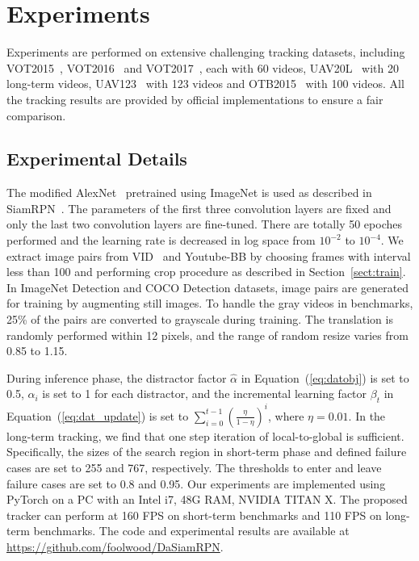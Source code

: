 \documentclass[runningheads]{llncs}
\begin{document}
\section{Experiments}

Experiments are performed on extensive challenging tracking datasets,
including VOT2015~\cite{VOT2015}, VOT2016~\cite{VOT2016} and VOT2017~\cite{VOT2017}, each with 60 videos, UAV20L~\cite{UAV} with 20 long-term videos, UAV123~\cite{UAV} with 123 videos and OTB2015~\cite{OTB2015} with 100 videos. All the tracking results are provided by official implementations to ensure a fair comparison.


\subsection{Experimental Details}

The modified AlexNet~\cite{AlexNet} pretrained using ImageNet \cite{ILSVRC15} is used as described in SiamRPN~\cite{SiamRPN}.
The parameters of the first three convolution layers are fixed and only the last two convolution
layers are fine-tuned. There are totally 50 epoches performed and the learning rate is decreased in log space from $10^{-2}$ to $10^{-4}$.
We extract image pairs from VID~\cite{ILSVRC15} and Youtube-BB \cite{YouTubeBB} by choosing frames with interval less than 100 and performing crop procedure as described in Section~\ref{sect:train}. In ImageNet Detection \cite{ILSVRC15} and COCO Detection \cite{COCO} datasets, image pairs are generated for training by augmenting still images.
To handle the gray videos in benchmarks, 25\% of the pairs are converted to grayscale during training. The translation is randomly performed within 12 pixels, and the range of random resize varies from 0.85 to 1.15. 

During inference phase, the distractor factor $\hat{\alpha}$ in Equation~(\ref{eq:datobj}) is set to 0.5, $\alpha_i$ is set to 1 for each distractor, and the incremental learning factor $\beta_t$ in Equation~(\ref{eq:dat_update}) is set to $\sum_{i=0}^{t-1}(\frac{\eta}{1-\eta})^i$, where $\eta=0.01$. In the long-term tracking, we find that one step iteration of local-to-global is sufficient. Specifically, the sizes of the search region in short-term phase and defined failure cases are set to 255 and 767, respectively. The thresholds to enter and leave failure cases are set to 0.8 and 0.95.
Our experiments are implemented using PyTorch on a PC with an Intel i7, 48G RAM, NVIDIA TITAN X. The proposed tracker can perform at 160 FPS on short-term benchmarks and 110 FPS on long-term benchmarks. The code and experimental results are available at \url{https://github.com/foolwood/DaSiamRPN}.
\end{document}
